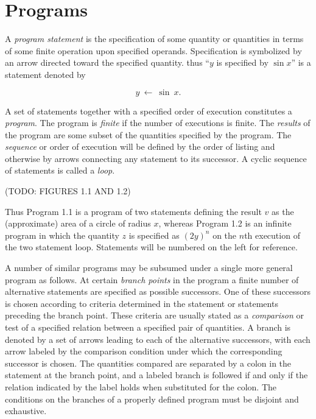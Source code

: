 \section{Programs}

\par A \textit{program statement} is the specification of some quantity or quantities in terms of some finite operation upon specified operands. Specification is symbolized by an arrow directed toward the specified quantity. thus ``$y$ is specified by $\sin x$'' is a statement denoted by

$$
      y\ ←\ \sin \ x.
$$

\par A set of statements together with a specified order of execution constitutes a \textit{program}. The program is \textit{finite} if the number of executions is finite. The \textit{results} of the program are some subset of the quantities specified by the program. The \textit{sequence} or order of execution will be defined by the order of listing and otherwise by arrows connecting any statement to its successor. A cyclic sequence of statements is called a \textit{loop}.

\par (TODO: FIGURES 1.1 AND 1.2)

\par Thus Program 1.1 is a program of two statements defining the result $v$ as the (approximate) area of a circle of radius $x$, whereas Program 1.2 is an infinite program in which the quantity $z$ is specified as $(2y)^n$ on the $n$th execution of the two statement loop. Statements will be numbered on the left for reference.

\par A number of similar programs may be subsumed under a single more general program as follows. At certain \textit{branch points} in the program a finite number of alternative statements are specified as possible successors. One of these successors is chosen according to criteria determined in the statement or statements preceding the branch point. These criteria are usually stated as a \textit{comparison} or test of a specified relation between a specified pair of quantities. A branch is denoted by a set of arrows leading to each of the alternative successors, with each arrow labeled by the comparison condition under which the corresponding successor is chosen. The quantities compared are separated by a colon in the statement at the branch point, and a labeled branch is followed if and only if the relation indicated by the label holds when substituted for the colon. The conditions on the branches of a properly defined program must be disjoint and exhaustive.

